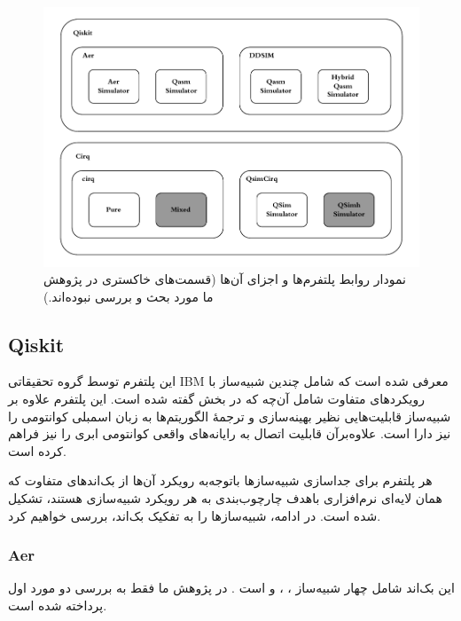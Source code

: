 \begin{figure}
 	\centering
 	\captionsetup{justification=centering,margin=2cm}
 	\includegraphics[scale=1]{images/backend_simulator_relation.pdf}
 	\caption[نمودار روابط پلتفرم‌ها و اجزای آن‌ها]{
 	نمودار روابط پلتفرم‌ها و اجزای آن‌ها (قسمت‌های خاکستری در پژوهش ما مورد بحث و بررسی نبوده‌اند.)
 	}
 	\label{fig:2}
 \end{figure}
 
\subsection{Qiskit}
 این پلتفرم توسط گروه تحقیقاتی IBM 
 \cite{javadi-abhari_quantum_2024}
 معرفی شده است که شامل چندین شبیه‌ساز با رویکردهای متفاوت شامل آن‌چه که در بخش
 گفته شده است. این پلتفرم علاوه بر شبیه‌ساز قابلیت‌هایی نظیر بهینه‌سازی و ترجمهٔ الگوریتم‌ها به زبان اسمبلی کوانتومی را نیز دارا است. علاوه‌برآن قابلیت اتصال به رایانه‌های واقعی کوانتومی ابری را نیز فراهم کرده است.
 
 هر پلتفرم برای جداسازی شبیه‌سازها باتوجه‌به رویکرد آن‌ها از بک‌اندهای متفاوت که همان لایه‌ای نرم‌افزاری باهدف چارچوب‌بندی به هر رویکرد شبیه‌سازی هستند، تشکیل شده است. در ادامه، شبیه‌سازها را به تفکیک بک‌اند، بررسی خواهیم کرد.
 
\subsubsection{Aer}
این بک‌اند شامل چهار شبیه‌ساز
، ،  و 
است
\cite{javadi-abhari_quantum_2024}.
در پژوهش ما فقط به بررسی دو مورد اول پرداخته شده است.


